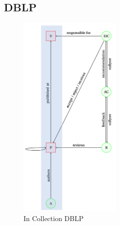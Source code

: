 \documentclass{ou-report}
\begin{document}
\subsection{DBLP}

\begin{figure}[H]
\includegraphics[width=5cm]{incollection_dblp}
\centering
\caption{In Collection DBLP}
\end{figure}
\end{document}
